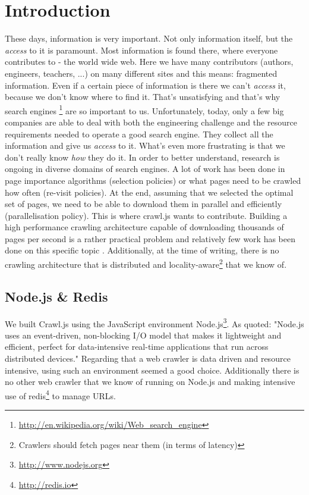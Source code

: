 
\chapter{Introduction} %

\label{Chapter1} %


These days, information is very important. Not only information itself, but the \emph{access} to it is paramount. Most information is found there, where everyone contributes to - the world wide web. Here we have many contributors (authors, engineers, teachers, ...) on many different sites and this means: fragmented information. Even if a certain piece of information is there we can't \emph{access} it, because we don't know where to find it. That's unsatisfying and that's why search engines \footnote{\url{http://en.wikipedia.org/wiki/Web_search_engine}} are so important to us.
\newline
Unfortunately, today, only a few big companies are able to deal with both the engineering challenge and the resource requirements needed to operate a good search engine. They collect all the information and give us \emph{access} to it. What's even more frustrating is that we don't really know \emph{how} they do it. In order to better understand, research is ongoing in diverse domains of search engines.
\newline
A lot of work has been done in page importance algorithms (selection policies) or what pages need to be crawled how often (re-visit policies)\cite{page_importance1}\cite{page_importance2}. At the end, assuming that we selected the optimal set of pages, we need to be able to download them in parallel and efficiently (parallelisation policy). This is where crawl.js wants to contribute. Building a high performance crawling architecture capable of downloading thousands of pages per second is a rather practical problem and relatively few work has been done on this specific topic \cite{ubicrawler}\cite{hp_crawler}. Additionally, at the time of writing, there is no crawling architecture that is distributed and locality-aware\footnote{Crawlers should fetch pages near them (in terms of latency)} that we know of.

\section{Node.js \& Redis}
We built Crawl.js using the JavaScript environment Node.js\footnote{\url{http://www.nodejs.org}}. As quoted: "Node.js uses an event-driven, non-blocking I/O model that makes it lightweight and efficient, perfect for data-intensive real-time applications that run across distributed devices." Regarding that a web crawler is data driven and resource intensive, using such an environment seemed a good choice. Additionally there is no other web crawler that we know of running on Node.js and making intensive use of redis\footnote{\url{http://redis.io}} to manage URLs.

